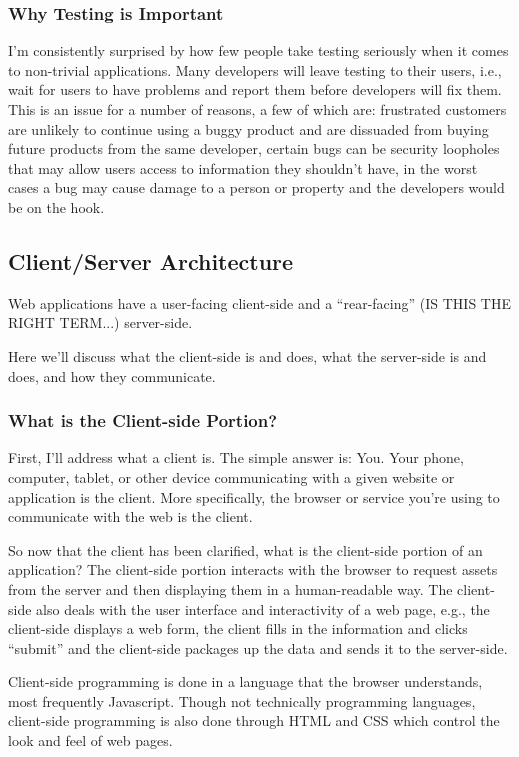 \documentclass[11pt]{article}
\begin{document}
\subsubsection{Why Testing is Important}
I'm consistently surprised by how few people take testing seriously when it comes to non-trivial applications. Many developers will leave testing to their users, i.e., wait for users to have problems and report them before developers will fix them. This is an issue for a number of reasons, a few of which are: frustrated customers are unlikely to continue using a buggy product and are dissuaded from buying future products from the same developer, certain bugs can be security loopholes that may allow users access to information they shouldn't have, in the worst cases a bug may cause damage to a person or property and the developers would be on the hook.


\subsection{Client/Server Architecture}
Web applications have a user-facing client-side and a ``rear-facing'' (IS THIS THE RIGHT TERM...) server-side.

Here we'll discuss what the client-side is and does, what the server-side is and does, and how they communicate.

\subsubsection{What is the Client-side Portion?}
First, I'll address what a client is. The simple answer is: You. Your phone, computer, tablet, or other device communicating with a given website or application is the client. More specifically, the browser or service you're using to communicate with the web is the client. 

So now that the client has been clarified, what is the client-side portion of an application? The client-side portion interacts with the browser to request assets from the server and then displaying them in a human-readable way. The client-side also deals with the user interface and interactivity of a web page, e.g., the client-side displays a web form, the client fills in the information and clicks ``submit'' and the client-side packages up the data and sends it to the server-side.

Client-side programming is done in a language that the browser understands, most frequently Javascript. Though not technically programming languages, client-side programming is also done through HTML and CSS which control the look and feel of web pages.
\end{document}
